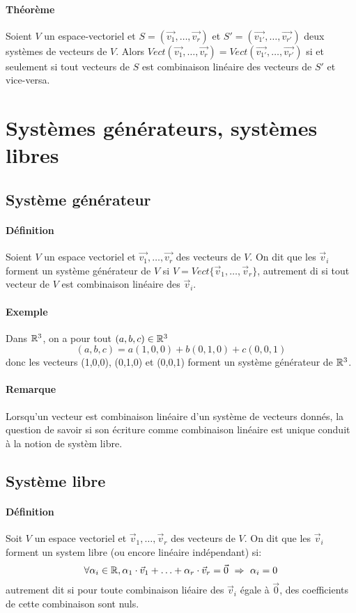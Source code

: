 \paragraph{Théorème} Soient $V$ un espace-vectoriel et $S = (\vec{v_1}, \ldots, \vec{v_r})$ et $S' = (\vec{v_{1'}}, \ldots, \vec{v_{r'}})$ deux systèmes de vecteurs de $V$. Alors $Vect(\vec{v_1}, \ldots, \vec{v_r}) = Vect(\vec{v_{1'}}, \ldots, \vec{v_{r'}})$ si et seulement si tout vecteurs de $S$ est combinaison linéaire des vecteurs de $S'$ et vice-versa.

%
%
\section{Systèmes générateurs, systèmes libres}
%
%


%
\subsection{Système générateur}
%
\paragraph{Définition} Soient $V$ un espace vectoriel et $\vec{v_1}, \ldots, \vec{v_r}$ des vecteurs de $V$. On dit que les $\vec{v}_i$ forment un système générateur de $V$ si $V = Vect\{\vec{v}_1, \ldots, \vec{v}_r\}$, autrement di si tout vecteur de $V$ est combinaison linéaire des $\vec{v}_i$.

\paragraph{Exemple} Dans $\mathbb{R}^3$, on a pour tout $(a,b,c) \in \mathbb{R}^3$ $$(a, b, c)=a(1,0,0)+b(0,1,0)+c(0,0,1)$$ donc les vecteurs (1,0,0), (0,1,0) et (0,0,1) forment un système générateur de $\mathbb{R}^3$.

\paragraph{Remarque} Lorsqu'un vecteur est combinaison linéaire d'un système de vecteurs donnés, la question de savoir si son écriture comme combinaison linéaire est unique conduit à la notion de systèm libre.


%
\subsection{Système libre}
%
\paragraph{Définition} Soit $V$ un espace vectoriel et $\vec{v}_1, \ldots , \vec{v}_r$ des vecteurs de $V$. On dit que les $\vec{v}_i$ forment un system libre (ou encore linéaire indépendant) si:
$$\forall \alpha_i \in \mathbb{R}, \alpha_1 \cdot \vec{v}_1 + \ldots + \alpha_r \cdot \vec{v}_r = \vec{0} ~ \Rightarrow ~ \alpha_i = 0$$
autrement dit si pour toute combinaison liéaire des $\vec{v}_i$ égale à $\vec{0}$, des coefficients de cette combinaison sont nuls.
